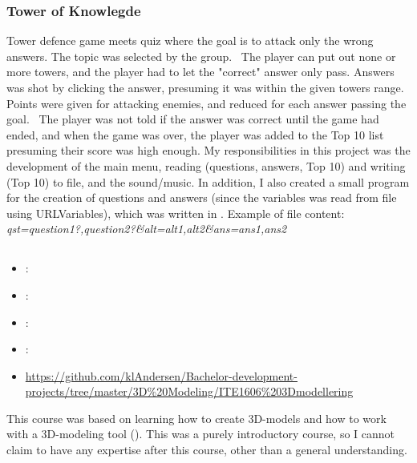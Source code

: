 \subsubsection{Tower of Knowlegde}
\label{sec:tower_of_knowledge}
Tower defence game meets quiz where the goal is to attack only the wrong answers. 
The topic was selected by the group. 
The player can put out none or more towers, and the player had to let the "correct" answer only pass.
\vspace{0.5em}\newline
Answers was shot by clicking the answer, presuming it was within the given towers range. 
Points were given for attacking enemies, and reduced for each answer passing the goal. 
The player was not told if the answer was correct until the game had ended, and when the game was over, the player was added to the Top 10 list presuming their score was high enough. 
My responsibilities in this project was the development of the main menu, reading (questions, answers, Top 10) and writing (Top 10) to file, and the sound/music.
\vspace{0.5em}\newline
In addition, I also created a small program for the creation of questions and answers (since the variables was read from file using URLVariables), which was written in .
\vspace{0.5em}\newline
Example of file content: \\
\textit{qst=question1?,question2?\&alt=alt1,alt2\&ans=ans1,ans2}

\subsection[3D Modelling]{}
\label{sec:ite1606_3d_modelling}
\begin{itemize} 
	\item {}: 
	\item {}: 
	\item {}: 
	\item {}: 
	\item {} \url{https://github.com/klAndersen/Bachelor-development-projects/tree/master/3D%20Modeling/ITE1606%203Dmodellering}
\end{itemize} 
This course was based on learning how to create 3D-models and how to work with a 3D-modeling tool (). 
This was a purely introductory course, so I cannot claim to have any expertise after this course, other than a general understanding.

